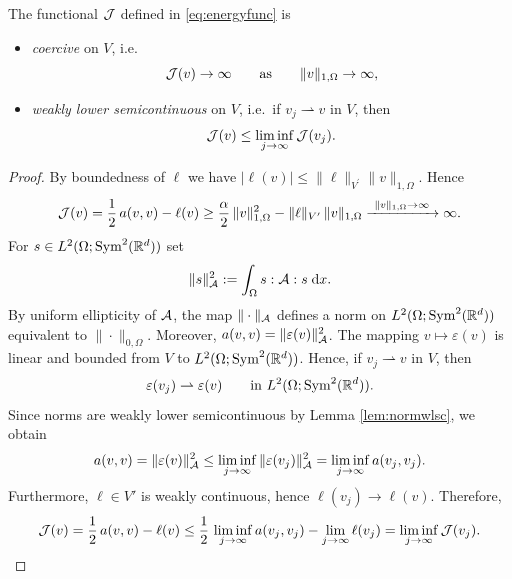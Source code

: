 \begin{lemma}\label{lem:Jcoercivewlsc}
	The functional ${\mathcal J}$ defined in \eqref{eq:energyfunc} is
	\begin{itemize}
		\item[i)]{\em coercive} on $V$, i.e.
		      \begin{equation*}
			      {\mathcal J}(v)\to\infty\qquad\text{as}\qquad\|v\|_{1,\Omega}\to\infty,
		      \end{equation*}
		\item[ii)] {\em weakly lower semicontinuous} on $V$, i.e.\ if $v_j\rightharpoonup v$ in $V$, then
		      \begin{equation*}
			      {\mathcal J}(v)\le \liminf_{j\to\infty}{\mathcal J}(v_j).
		      \end{equation*}
	\end{itemize}
\end{lemma}
\begin{proof}
	By boundedness of $\ell$ we have $|\ell(v)|\le \|\ell\|_{V^\prime}\|v\|_{1,\Omega}$. Hence
	\begin{equation*}
		{\mathcal J}(v)=\frac{1}{2}\,a(v,v)-\ell(v)
		\ge \frac{\alpha}{2}\,\|v\|_{1,\Omega}^2-\|\ell\|_{V^\prime}\,\|v\|_{1,\Omega}
		\xrightarrow{ \ \|v\|_{1,\Omega}\to\infty \ }\infty.
	\end{equation*}
	For $s\in L^2(\Omega;\mathrm{Sym}^2({\mathbb R}^d))$ set
	\begin{equation*}
		\|s\|_{\mathcal A}^2 := \int_\Omega s:{\mathcal A}:s\;{{\mathrm{d}} x}.
	\end{equation*}
	By uniform ellipticity of ${\mathcal A}$, the map $\|\cdot\|_{\mathcal A}$ defines a norm on $L^2(\Omega;\mathrm{Sym}^2({\mathbb R}^d))$
	equivalent to $\|\cdot\|_{0,\Omega}$. Moreover, $a(v,v)=\|\varepsilon(v)\|_{\mathcal A}^2$.
	The mapping $v\mapsto \varepsilon(v)$ is linear and bounded from $V$ to
	$L^2(\Omega;\mathrm{Sym}^2({\mathbb R}^d))$. Hence, if $v_j\rightharpoonup v$ in $V$, then
	\begin{equation*}
		\varepsilon(v_j)\rightharpoonup \varepsilon(v)
		\qquad\text{in } L^2(\Omega;\mathrm{Sym}^2({\mathbb R}^d)).
	\end{equation*}
	Since norms are weakly lower semicontinuous by Lemma \ref{lem:normwlsc}, we obtain
	\begin{equation*}
		a(v,v)=\|\varepsilon(v)\|_{\mathcal A}^2
		\le \liminf_{j\to\infty}\|\varepsilon(v_j)\|_{\mathcal A}^2
		= \liminf_{j\to\infty} a(v_j,v_j).
	\end{equation*}
	Furthermore, $\ell\in V'$ is weakly continuous, hence $\ell(v_j)\to \ell(v)$.
	Therefore,
	\begin{equation*}
		{\mathcal J}(v)=\frac{1}{2}\,a(v,v)-\ell(v)
		\le \frac{1}{2}\,\liminf_{j\to\infty} a(v_j,v_j) - \lim_{j\to\infty}\ell(v_j)
		= \liminf_{j\to\infty}{\mathcal J}(v_j).
	\end{equation*}
\end{proof}

